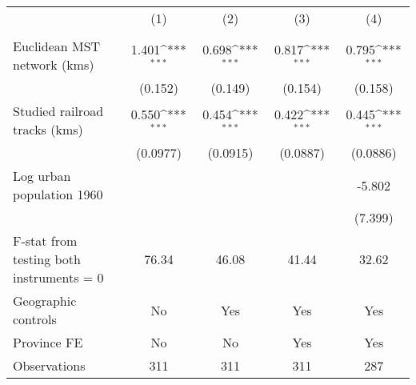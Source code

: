 {
\def\sym#1{\ifmmode^{#1}\else\(^{#1}\)\fi}
\begin{tabular}{l*{4}{c}}
\hline\hline
                &\multicolumn{1}{c}{(1)}&\multicolumn{1}{c}{(2)}&\multicolumn{1}{c}{(3)}&\multicolumn{1}{c}{(4)}\\
                &\multicolumn{1}{c}{}&\multicolumn{1}{c}{}&\multicolumn{1}{c}{}&\multicolumn{1}{c}{}\\
\hline
Euclidean MST network (kms)&    1.401\sym{***}&    0.698\sym{***}&    0.817\sym{***}&    0.795\sym{***}\\
                &  (0.152)         &  (0.149)         &  (0.154)         &  (0.158)         \\
[1em]
Studied railroad tracks (kms)&    0.550\sym{***}&    0.454\sym{***}&    0.422\sym{***}&    0.445\sym{***}\\
                & (0.0977)         & (0.0915)         & (0.0887)         & (0.0886)         \\
[1em]
Log urban population 1960&                  &                  &                  &   -5.802         \\
                &                  &                  &                  &  (7.399)         \\
\hline
F-stat from testing both instruments = 0&    76.34         &    46.08         &    41.44         &    32.62         \\
Geographic controls&       No         &      Yes         &      Yes         &      Yes         \\
Province FE     &       No         &       No         &      Yes         &      Yes         \\
Observations    &      311         &      311         &      311         &      287         \\
\hline\hline
\end{tabular}
}

